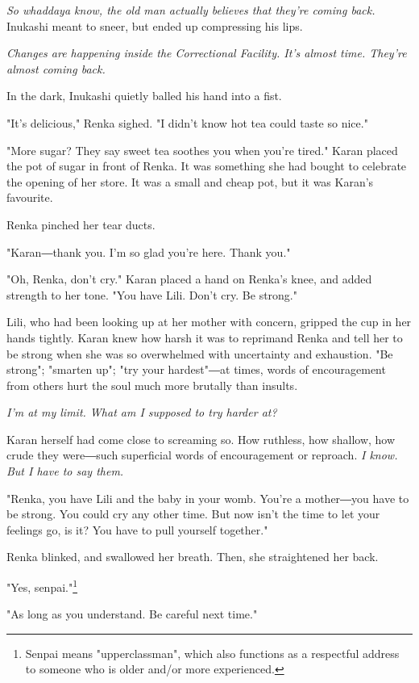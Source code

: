 \emph{So whaddaya know, the old man actually believes that they're coming
	back.} Inukashi meant to sneer, but ended up compressing his lips.

\emph{Changes are happening inside the Correctional Facility. It's almost
	time. They're almost coming back.}

In the dark, Inukashi quietly balled his hand into a fist.

\mybreak

"It's delicious," Renka sighed. "I didn't know hot tea could taste so
nice."

"More sugar? They say sweet tea soothes you when you're tired." Karan
placed the pot of sugar in front of Renka. It was something she had
bought to celebrate the opening of her store. It was a small and cheap
pot, but it was Karan's favourite.

Renka pinched her tear ducts.

"Karan―thank you. I'm so glad you're here. Thank you."

"Oh, Renka, don't cry." Karan placed a hand on Renka's knee, and added
strength to her tone. "You have Lili. Don't cry. Be strong."

Lili, who had been looking up at her mother with concern, gripped the
cup in her hands tightly. Karan knew how harsh it was to reprimand Renka
and tell her to be strong when she was so overwhelmed with uncertainty
and exhaustion. "Be strong"; "smarten up"; "try your hardest"―at times,
words of encouragement from others hurt the soul much more brutally than
insults.

\emph{I'm at my limit. What am I supposed to try harder at?}

Karan herself had come close to screaming so. How ruthless, how shallow,
how crude they were―such superficial words of encouragement or reproach.
\emph{I know. But I have to say them.}

"Renka, you have Lili and the baby in your womb. You're a mother―you
have to be strong. You could cry any other time. But now isn't the time
to let your feelings go, is it? You have to pull yourself together."

Renka blinked, and swallowed her breath. Then, she straightened her
back.

"Yes, senpai."\footnote{Senpai means "upperclassman", which also functions as a respectful address to someone who is older and/or more experienced.}

"As long as you understand. Be careful next time."

